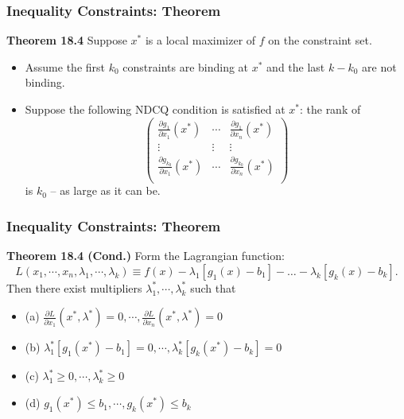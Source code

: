 \documentclass[9pt,aspectratio=169]{beamer}
\begin{document}
\begin{frame}
	\frametitle{Inequality Constraints: Theorem}
    \begin{block}{\textbf{Theorem 18.4}}
        Suppose $x^*$ is a local maximizer of $f$ on the constraint set.
        \begin{itemize}
            \item Assume the first $k_0$ constraints are binding at
            $x^*$ and the last $k-k_0$ are not binding.
            \item Suppose the following NDCQ condition is satisfied at
            $x^*$: the rank of
            $$\left({\begin{array}{ccc} 
                      \frac{\partial g_1}{\partial x_1}(x^*) & \cdots &\frac{\partial g_1}{\partial x_n}(x^*)\\
                      \vdots & \vdots & \vdots \\	
                      \frac{\partial g_{k_0}}{\partial x_1}(x^*) & \cdots &\frac{\partial g_{k_0}}{\partial x_n}(x^*)\\		
                  \end{array}}\right) $$ is $k_0$ -- as large as it can be.
        \end{itemize}		    
    \end{block}
    
\end{frame}	

\begin{frame}
    \frametitle{Inequality Constraints: Theorem}
    \begin{block}{\textbf{Theorem 18.4 (Cond.)}}
        Form the Lagrangian function: 
        \begin{equation*}
            L(x_1,\cdots,x_n,\lambda_1,\cdots,\lambda_k)  \equiv f(x) -
            \lambda_1[g_1(x)-b_1] - \ldots - \lambda_k[g_k(x)-b_k].
        \end{equation*}
        Then there exist multipliers $\lambda_1^*,\cdots, \lambda_k^*$ such that \small
        \begin{itemize}
            \item (a) $\frac{\partial L}{\partial x_1}(x^*,\lambda^*) = 0,\cdots, \frac{\partial L}{\partial x_n}(x^*,\lambda^*) = 0 $
            \item (b) $\lambda_1^*[g_1(x^*)-b_1] = 0, \cdots, \lambda_k^*[g_k(x^*)-b_k] = 0$ 
            \item (c) $\lambda_1^* \geq 0, \cdots, \lambda_k^* \geq 0$
            \item (d) $g_1(x^*)\leq b_1,\cdots, g_k(x^*)\leq b_k$
        \end{itemize}		
    \end{block}
\end{frame}	
\end{document}
